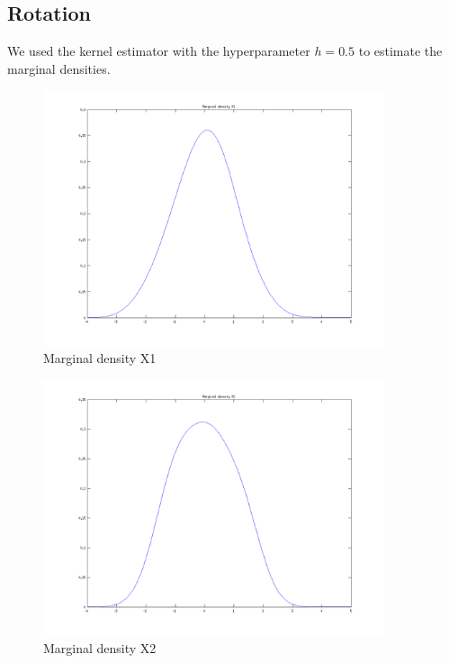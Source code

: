 \documentclass{article}
\begin{document}
	\subsection{Rotation}
		We used the kernel estimator with the hyperparameter $h=0.5$ to estimate the marginal densities.
		\begin{figure}[H]
			\centering
			\includegraphics[width=10cm]{task3MarginalDensityX1.png}
			\caption{Marginal density X1}
			\label{fig:task3MarginalDensityX1}
		\end{figure}
		\begin{figure}[H]
			\centering
			\includegraphics[width=10cm]{task3MarginalDensityX2.png}
			\caption{Marginal density X2}
			\label{fig:task3MarginalDensityX2}
		\end{figure}
		
\end{document}
